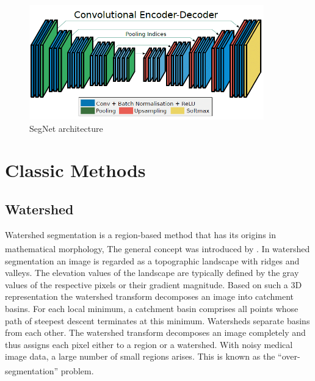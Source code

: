\begin{figure}[h]
\centering
  \vspace{0.2in}
    \centerline{\includegraphics[width = 4in]{../images/segnet.png}}
    \caption{SegNet architecture}
\end{figure}

\newpage

\section{Classic Methods}
\subsection{Watershed}
\hspace{\parindent}
Watershed segmentation is a region-based method that has its origins in mathematical morphology, The general concept was introduced by \textsuperscript{\cite{digabel1978iterative}}.
In watershed segmentation an image is regarded as a topographic landscape with ridges and valleys. The elevation values of the landscape are typically defined by the gray values of the respective pixels or their gradient magnitude. Based on such a 3D representation the watershed transform decomposes an image into catchment basins. For each local minimum, a catchment basin comprises all points whose path of steepest descent terminates at this minimum. Watersheds separate basins from each other. The watershed transform decomposes an image completely and thus assigns each pixel either to a region or a watershed. With noisy medical image data, a large number of small regions arises. This is known as the “over-segmentation” problem. \textsuperscript{\cite{Vincent_And_Soille_2022_sciencedirect}}

